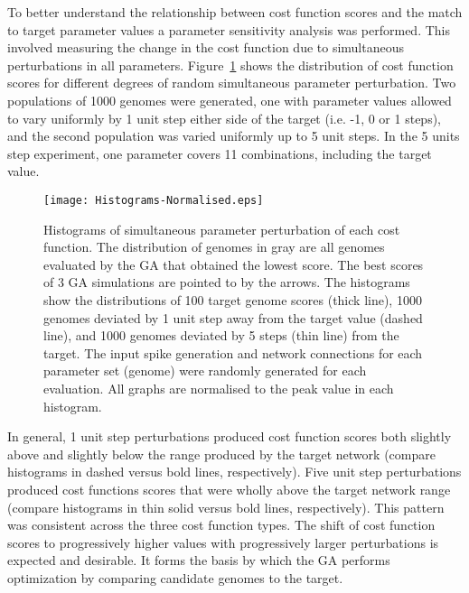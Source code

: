 To better understand the relationship between cost function scores and the match
to target parameter values a parameter sensitivity analysis was performed. This
involved measuring the change in the cost function due to simultaneous
perturbations in all parameters.  Figure~\ref{fig:GA:R3} shows the distribution of
cost function scores for different degrees of random simultaneous parameter
perturbation. Two populations of 1000 genomes were generated, one with parameter
values allowed to vary uniformly by 1 unit step either side of the target
(i.e. -1, 0 or 1 steps), and the second population was varied uniformly up to 5
unit steps.  In the 5 units step experiment, one parameter covers 11
combinations, including the target value.


\begin{figure}[th!]
  \centering
  \texttt{[image: Histograms-Normalised.eps]}  
  \caption{Histograms of simultaneous parameter perturbation of each cost
    function. The distribution of genomes in gray are all genomes evaluated by
    the GA that obtained the lowest score. The best scores of 3 GA simulations
    are pointed to by the arrows. The histograms show the distributions of 100
    target genome scores (thick line), 1000 genomes deviated by 1 unit step away
    from the target value (dashed line), and 1000 genomes deviated by 5 steps
    (thin line) from the target. The input spike generation and network
    connections for each parameter set (genome) were randomly generated for each
    evaluation.  All graphs are normalised to the peak value in each
    histogram.}\label{fig:GA:R3}
\end{figure}


\smallskip{}

In general, 1 unit step perturbations produced cost function scores both
slightly above and slightly below the range produced by the target network
(compare histograms in dashed versus bold lines, respectively). Five unit
step perturbations produced cost functions scores that were wholly above
the target network range (compare histograms in thin solid versus bold
lines, respectively). This pattern was consistent across the three cost
function types. The shift of cost function scores to progressively higher
values with progressively larger perturbations is expected and
desirable. It forms the basis by which the GA performs optimization by
comparing candidate genomes to the target.

